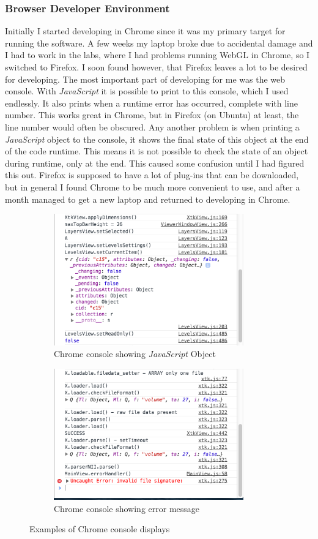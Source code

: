 \documentclass[a4paper,11pt,twoside]{article}
\begin{document}
\subsubsection{Browser Developer Environment}

Initially I started developing in Chrome since it was my primary target for running the software. A few weeks my laptop broke due to accidental damage and I had to work in the labs, where I had problems running WebGL in Chrome, so I switched to Firefox. I soon found however, that Firefox leaves a lot to be desired for developing. The most important part of developing for me was the web console. With \textit{JavaScript} it is possible to print to this console, which I used endlessly. It also prints when a runtime error has occurred, complete with line number. This works great in Chrome, but in Firefox (on Ubuntu) at least, the line number would often be obscured. Any another problem is when printing a \textit{JavaScript} object to the console, it shows the final state of this object at the end of the code runtime. This means it is not possible to check the state of an object during runtime, only at the end. This caused some confusion until I had figured this out. Firefox is supposed to have a lot of plug-ins that can be downloaded, but in general I found Chrome to be much more convenient to use, and after a month managed to get a new laptop and returned to developing in Chrome.


\begin{figure}
\centering
\begin{subfigure}{.5\textwidth}
  \centering
  \includegraphics[width=82mm]{graphics/console_01.png}
  \caption{Chrome console showing \textit{JavaScript} Object}
\end{subfigure}%
\begin{subfigure}{.5\textwidth}
  \centering
  \includegraphics[width=82mm]{graphics/console_02.png}
  \caption{Chrome console showing error message}
\end{subfigure}
\caption{Examples of Chrome console displays}

\end{figure}
\end{document}
